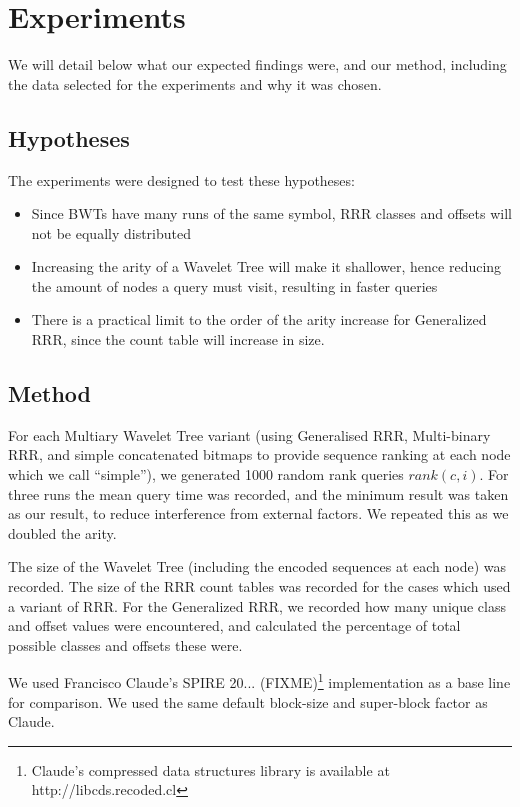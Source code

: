 \section{Experiments}
We will detail below what our expected findings were, and our method, including 
the data selected for the experiments and why it was chosen.

\subsection{Hypotheses}
The experiments were designed to test these hypotheses:

\begin{itemize}
    \item 	
			Since BWTs have many runs of the same symbol, RRR classes and 
			offsets will not be equally distributed

    \item 	
			Increasing the arity of a Wavelet Tree will make it shallower,
		   	hence reducing the amount of nodes a query must visit, resulting
		   	in faster queries
			
    \item  
			There is a practical limit to the order of the arity increase for 
		   	Generalized RRR, since the count table will increase in size.
\end{itemize}

\subsection{Method}
For each Multiary Wavelet Tree variant (using Generalised RRR, Multi-binary
RRR, and simple concatenated bitmaps to provide
sequence ranking at each node which we call ``simple''), we generated 1000 
random rank queries $rank(c, i)$. For three runs the mean query time was 
recorded, and the minimum result was taken as our result, to reduce interference 
from external factors. We repeated this as we doubled the arity.

The size of  the Wavelet Tree (including the encoded sequences at each node) was 
recorded. The size of the RRR count tables was recorded for the cases which used 
a variant of RRR. For the Generalized RRR, we recorded how many unique class and 
offset values were encountered, and calculated the percentage of total possible 
classes and offsets these were.

We used Francisco Claude's SPIRE 20... (FIXME)\footnote{Claude's compressed data 
structures library is available at http://libcds.recoded.cl} implementation as a 
base line for comparison. We used the same default block-size and 
super-block factor as Claude.


